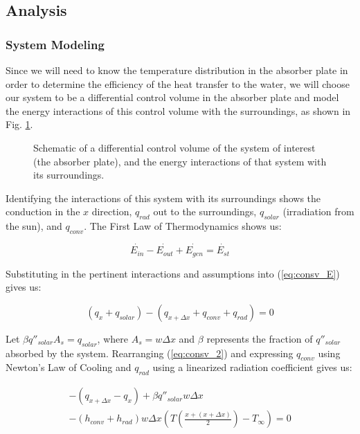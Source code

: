 \documentclass[]{article}
\begin{document}
\subsection{Analysis}

\subsubsection{System Modeling}

Since we will need to know the temperature distribution in the absorber plate in order to determine the efficiency of the heat transfer to the water, we will choose our system to be a differential control volume in the absorber plate and model the energy interactions of this control volume with the surroundings, as shown in Fig. \ref{fig:model_schematic}.

\begin{figure}[h]
	\centering
	\caption{Schematic of a differential control volume of the system of interest (the absorber plate), and the energy interactions of that system with its surroundings.}
	\label{fig:model_schematic}
\end{figure}

Identifying the interactions of this system with its surroundings shows the conduction in the $x$ direction, $q_{rad}$ out to the surroundings, $q_{solar}$ (irradiation from the sun), and $q_{conv}$. The First Law of Thermodynamics shows us:

\begin{equation} \label{eq:consv_E}
	\dot{E_{in}} - \dot{E_{out}} + \dot{E_{gen}} = \dot{E_{st}}
\end{equation}

Substituting in the pertinent interactions and assumptions into (\ref{eq:consv_E}) gives us:

\begin{equation} \label{eq:consv_2}
	(q_x + q_{solar}) - (q_{x + \Delta x} + q_{conv} + q_{rad}) = 0
\end{equation}

Let $\beta q''_{solar} A_s = q_{solar}$, where $A_s = w\Delta x$ and $\beta$ represents the fraction of $q''_{solar}$ absorbed by the system. Rearranging (\ref{eq:consv_2}) and expressing $q_{conv}$ using Newton's Law of Cooling and $q_{rad}$ using a linearized radiation coefficient gives us:

\begin{multline} \label{eq:consv_3}
	-(q_{x + \Delta x} - q_x) + \beta q''_{solar} w\Delta x \\- (h_{conv} + h_{rad})w\Delta x(T(\frac{x + (x + \Delta x)}{2}) - T_{\infty}) = 0
\end{multline}
\end{document}
